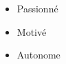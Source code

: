 %
%
%

\twocolumnsection
{
\begin{skills}
\end{skills}}
{
\vspace{1em}
\begin{itemize}
	\item Passionné
	\item Motivé                    
    \item Autonome
\end{itemize}
}
